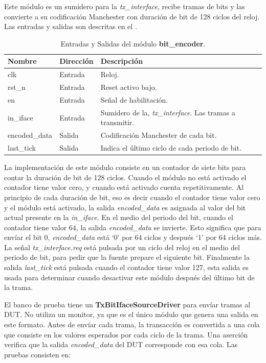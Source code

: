 \documentclass[a4paper, twoside, 11pt]{report}
\begin{document}
Este módulo es un sumidero para la \textit{tx\_interface}, recibe tramas de bits y las convierte a su codificación Manchester con duración de bit de 128 ciclos del reloj. Las entradas y salidas son descritas en el .

\begin{table}[htb]
  \centering
  \tablezebra
  \begin{tabulary}{\linewidth}{l|l|L}
    \textbf{Nombre}&\textbf{Dirección}&\textbf{Descripción} \\
    \hline
    clk&Entrada&Reloj. \\
    rst\_n&Entrada&Reset activo bajo. \\
    en&Entrada&Señal de habilitación. \\
    in\_iface&Entrada&Sumidero de la, \textit{tx\_interface}. Las tramas a transmitir. \\
    encoded\_data&Salida&Codificación Manchester de cada bit. \\
    last\_tick&Salida&Indica el último ciclo de cada periodo de bit. \\
  \end{tabulary}
  \caption{Entradas y Salidas del módulo \textbf{bit\_encoder}.}
  \label{tab:ports_bit_encoder}
\end{table}

La implementación de este módulo consiste en un contador de siete bits para contar la duración de bit de 128 ciclos. Cuando el módulo no está activado el contador tiene valor cero, y cuando está activado cuenta repetitivamente. Al principio de cada duración de bit, eso es decir cuando el contador tiene valor cero y el módulo está activado, la salida \textit{encoded\_data} es asignada al valor del bit actual presente en la \textit{in\_iface}. En el medio del periodo del bit, cuando el contador tiene valor 64, la salida \textit{encoded\_data} se invierte. Esto significa que para envíar el bit 0, \textit{encoded\_data} está ‘0’ por 64 ciclos y después ‘1’ por 64 ciclos más. La señal \textit{tx\_interface.req} está pulsada por un ciclo del reloj en el medio del periodo de bit, para pedir que la fuente prepare el siguiente bit. Finalmente la salida \textit{last\_tick} está pulsada cuando el contador tiene valor 127, esta salida es usada para determinar cuando desactivar este módulo después del último bit de la trama.

El banco de prueba tiene un \textbf{TxBitIfaceSourceDriver} para envíar tramas al DUT. No utiliza un monitor, ya que es el único módulo que genera una salida en este formato. Antes de envíar cada trama, la transacción es convertida a una cola que consiste en los valores esperados por cada ciclo de la trama. Una aserción verifica que la salida \textit{encoded\_data} del DUT corresponde con esa cola. Las pruebas consisten en:
\end{document}
